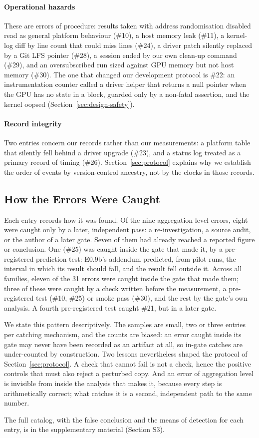\paragraph{Operational hazards}
These are errors of procedure: results taken with address randomisation
disabled read as general platform behaviour (\#10), a host memory leak (\#11), a kernel-log diff
by line count that could miss lines (\#24), a driver patch silently replaced by a Git LFS
pointer (\#28), a session ended by our own clean-up command (\#29), and an
oversubscribed run sized against GPU memory but not host memory (\#30). The one
that changed our development protocol is \#22: an instrumentation counter called
a driver helper that returns a null pointer when the GPU has no state in a
block, guarded only by a non-fatal assertion, and the kernel oopsed
(Section~\ref{sec:design-safety}).

\paragraph{Record integrity}
Two entries concern our records rather than our measurements: a platform table
that silently fell behind a driver upgrade (\#23), and a status log treated as
a primary record of timing (\#26). Section~\ref{sec:protocol} explains why we
establish the order of events by version-control ancestry, not by the clocks in
those records.

\subsection{How the Errors Were Caught}

Each entry records how it was found. Of the nine aggregation-level errors, eight
were caught only by a later, independent pass: a re-investigation, a source
audit, or the author of a later gate. Seven of them had already reached a
reported figure or conclusion. One (\#25) was caught inside the gate that made
it, by a pre-registered prediction test: E0.9b's addendum predicted, from pilot
runs, the interval in which its result should fall, and the result fell outside
it. Across all families, eleven of the 31 errors were caught inside the gate
that made them; three of these were caught by a check written before the
measurement, a pre-registered test (\#10, \#25) or smoke pass (\#30), and the
rest by the gate's own analysis. A fourth pre-registered test caught \#21, but
in a later gate.

We state this pattern descriptively. The samples are small, two or three entries
per catching mechanism, and the counts are biased: an error caught inside its gate may
never have been recorded as an artifact at all, so in-gate catches are
under-counted by construction. Two lessons nevertheless shaped the protocol of
Section~\ref{sec:protocol}. A check that cannot fail is not a check, hence the
positive controls that must also reject a perturbed copy. And an error of
aggregation level is invisible from inside the analysis that makes it, because
every step is arithmetically correct; what catches it is a second, independent
path to the same number.

The full catalog, with the false conclusion and the means of detection for each
entry, is in the supplementary material (Section S3).
